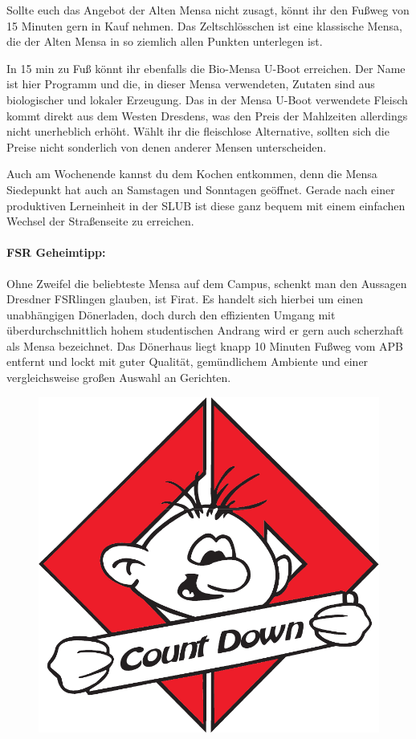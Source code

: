 Sollte euch das Angebot der Alten Mensa nicht zusagt, könnt ihr den Fußweg von 15 Minuten gern in Kauf nehmen. Das Zeltschlösschen ist eine klassische Mensa, die der Alten Mensa in so ziemlich allen Punkten unterlegen ist.

In 15 min zu Fuß könnt ihr ebenfalls die Bio-Mensa U-Boot erreichen. Der Name ist hier Programm und die, in dieser Mensa verwendeten, Zutaten sind aus biologischer und lokaler Erzeugung.
Das in der Mensa U-Boot verwendete Fleisch kommt direkt aus dem Westen Dresdens, was den Preis der Mahlzeiten allerdings nicht unerheblich erhöht.
Wählt ihr die fleischlose Alternative, sollten sich die Preise nicht sonderlich von denen anderer Mensen unterscheiden.

Auch am Wochenende kannst du dem Kochen entkommen, denn die Mensa Siedepunkt hat auch an Samstagen und Sonntagen geöffnet.
Gerade nach einer produktiven Lerneinheit in der SLUB ist diese ganz bequem mit einem einfachen Wechsel der Straßenseite zu erreichen.

\paragraph{FSR Geheimtipp:}
Ohne Zweifel die beliebteste Mensa auf dem Campus, schenkt man den Aussagen Dresdner FSRlingen glauben, ist Firat.
Es handelt sich hierbei um einen unabhängigen Dönerladen, doch durch den effizienten Umgang mit überdurchschnittlich hohem studentischen Andrang wird er gern auch scherzhaft als Mensa bezeichnet.
Das Dönerhaus liegt knapp 10 Minuten Fußweg vom APB entfernt und lockt mit guter Qualität, gemündlichem Ambiente und einer vergleichsweise großen Auswahl an Gerichten.


\begin{figure}%
  \vspace{-.5cm}
  \includegraphics[width=\linewidth]{img/countdown}
  \vspace{-1cm}
\end{figure}

